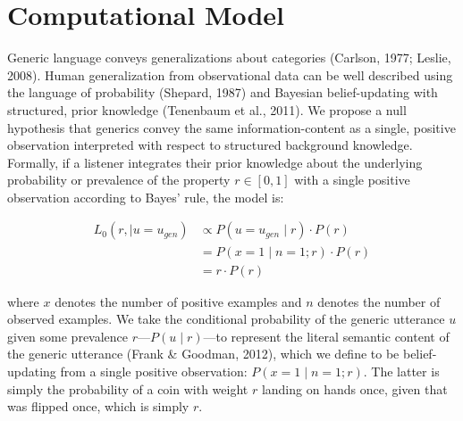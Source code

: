 \documentclass[floatsintext,doc]{apa6}
\begin{document}
\hypertarget{computational-model}{%
\section{Computational Model}\label{computational-model}}

Generic language conveys generalizations about categories (Carlson, 1977; Leslie, 2008).
Human generalization from observational data can be well described using the language of probability (Shepard, 1987) and Bayesian belief-updating with structured, prior knowledge (Tenenbaum et al., 2011).
We propose a null hypothesis that generics convey the same information-content as a single, positive observation interpreted with respect to structured background knowledge.
Formally, if a listener integrates their prior knowledge about the underlying probability or prevalence of the property \(r \in [0, 1]\) with a single positive observation according to Bayes' rule, the model is:


\begin{align}
L_0(r, \mid u = u_{gen}) &\propto P(u = u_{gen} \mid r) \cdot P(r)  \nonumber \\
 &= P(x = 1 \mid n = 1; r) \cdot P(r) \nonumber \\
 &= r \cdot P(r) \label{eq:L0}
\end{align}

\noindent where \(x\) denotes the number of positive examples and \(n\) denotes the number of observed examples.
We take the conditional probability of the generic utterance \(u\) given some prevalence \(r\)---\(P(u\mid r)\)---to represent the literal semantic content of the generic utterance (Frank \& Goodman, 2012), which we define to be belief-updating from a single positive observation: \(P(x =1 \mid n = 1; r)\).
The latter is simply the probability of a coin with weight \(r\) landing on hands once, given that was flipped once, which is simply \(r\).
\end{document}
